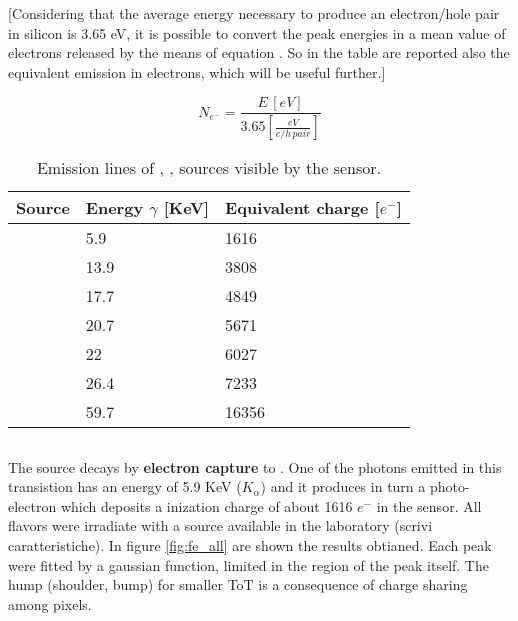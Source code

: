 [Considering that the average energy necessary to produce an electron/hole pair in silicon is 3.65 eV, it is possible to convert the peak energies in a mean value of electrons released by the means of equation . So in the table are reported also the equivalent emission in electrons, which will be useful further.]

\begin{equation}
N_{e^{-}} = \frac{E \, [eV]}{3.65 [\frac{eV}{e/h \, pair}]}
\label{energy_electron_conv}
\end{equation}


\begin{table}[h!]
\centering
\begin{tabular}{>{} C{3cm}|C{2.8cm}|C{2.8cm}}
Source & Energy $\gamma$ [KeV] & Equivalent charge [$e^{-}$]\\[2ex]
\hline
{} & 5.9 & 1616\\[0.5ex]
\hline
{} & 13.9 & 3808\\[0.5ex]
\hline
{} & 17.7 & 4849\\[0.5ex]
\hline
{} & 20.7 & 5671\\[0.5ex]
\hline
{} & 22 & 6027\\[0.5ex]
\hline
{} & 26.4 & 7233\\[0.5ex]
\hline
{} & 59.7 & 16356\\
\hline
\end{tabular}
\caption{Emission lines of , ,  sources visible by the sensor.}
\label{tab:radio_sources}
\end{table}

\subsection{}

The  source decays by \textbf{electron capture} to . One of the photons emitted in this transistion has an energy of 5.9 KeV ($K_{\alpha}$) and it produces in turn a photo-electron which deposits a inization charge of about 1616 $e^{-}$ in the sensor. 
All flavors were irradiate with a  source available in the laboratory (scrivi caratteristiche). In figure \vref{fig:fe_all} are shown the results obtianed. Each peak were fitted by a gaussian function, limited in the region of the peak itself. The hump (shoulder, bump) for smaller ToT is a consequence of charge sharing among pixels. 

